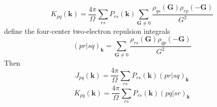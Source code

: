 \documentclass{article}
\begin{document}
            \begin{equation}
                K_{pq}(\textbf{k}) = \frac{4\pi}{\Omega}\sum_{rs}P_{rs}(\textbf{k})
                \sum_{\textbf{G}\neq 0}\frac{\rho_{qs}(\textbf{G})\rho_{rp}(-\textbf{G})}{G^2}
            \end{equation}
            define the four-center two-electron repulsion integrals
            \begin{equation}
                (pr|sq)_{\textbf{k}} = \sum_{\textbf{G}\neq 0}\frac{\rho_{rs}(\textbf{G})\rho_{qp}(-\textbf{G})}{G^2}
            \end{equation}
            Then
            \begin{equation}
                J_{pq}(\textbf{k}) = \frac{4\pi}{\Omega}\sum_{rs}P_{rs}(\textbf{k})(pr|sq)_{\textbf{k}}
            \end{equation}
            \begin{equation}
                K_{pq}(\textbf{k}) = \frac{4\pi}{\Omega}\sum_{rs}P_{rs}(\textbf{k})(pq|sr)_{\textbf{k}}
            \end{equation}
\end{document}
